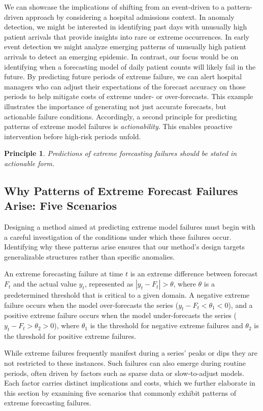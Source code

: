 \documentclass[ijds,sglanonrev]{informs4}
\newtheorem{principle}{Principle}
\begin{document}
We can showcase the implications of shifting from an event-driven to a pattern-driven approach by considering a hospital admissions context. In anomaly detection, we might be interested in identifying past days with unusually high patient arrivals that provide insights into rare or extreme occurrences. In early event detection we might analyze emerging patterns of unusually high patient arrivals to detect an emerging epidemic. In contrast, our focus would be on identifying when a forecasting model of daily patient counts will likely fail in the future. By predicting future periods of extreme failure, we can alert hospital managers who can adjust their expectations of the forecast accuracy on those periods to help mitigate costs of extreme under- or over-forecasts. This example illustrates the importance of generating not just accurate forecasts, but actionable failure conditions. Accordingly, a second principle for predicting patterns of extreme model failures is \emph{actionability}. This enables proactive intervention before high-risk periods unfold.

\begin{principle}
\textit{Predictions of extreme forecasting failures should be stated in actionable form.}
\end{principle}

\subsection{Why Patterns of Extreme Forecast Failures Arise: Five Scenarios}

Designing a method aimed at predicting extreme model failures must begin with a careful investigation of the conditions under which these failures occur. Identifying why these patterns arise ensures that our method’s design targets generalizable structures rather than specific anomalies.

An extreme forecasting failure at time $t$ is an extreme difference between forecast $F_t$ and the actual value $y_t$, represented as $|y_t - F_t| > \theta$, where $\theta$ is a predetermined threshold that is critical to a given domain. A negative extreme failure occurs when the model over-forecasts the series ($y_t - F_t < \theta_1 < 0$), and a positive extreme failure occurs when the model under-forecasts the series ($y_t - F_t > \theta_2 > 0$), where $\theta_1$ is the threshold for negative extreme failures and $\theta_2$ is the threshold for positive extreme failures.

While extreme failures frequently manifest during a series’ peaks or dips \citep{marvin2022} they are not restricted to these instances. Such failures can also emerge during routine periods, often driven by factors such as sparse data or slow-to-adjust models. Each factor carries distinct implications and costs, which we further elaborate in this section by examining five scenarios that commonly exhibit patterns of extreme forecasting failures.
\end{document}
